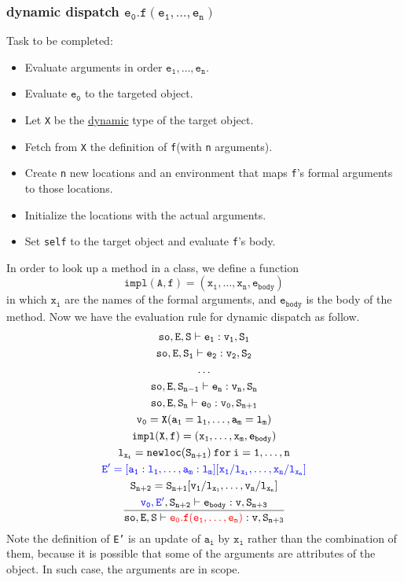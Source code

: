 \subsubsection{dynamic dispatch $\mathtt{e_0.f(e_1,\dots,e_n)}$}
Task to be completed:
\begin{itemize}
\item Evaluate arguments in order $\mathtt{e_1,\dots,e_n}$.
\item Evaluate $\mathtt{e_0}$ to the targeted object.
\item Let \texttt{X} be the \underline{dynamic} type of the target object.
\item Fetch from \texttt{X} the definition of \texttt{f}(with \texttt{n} arguments).
\item Create \texttt{n} new locations and an environment that maps \texttt{f}'s formal arguments to those locations.
\item Initialize the locations with the actual arguments.
\item Set \texttt{self} to the target object and evaluate \texttt{f}'s body.
\end{itemize}
In order to look up a method in a class, we define a function
\begin{equation*}
\mathtt{impl(A,f)=(x_1,\dots,x_n,e_{body})}
\end{equation*}
in which $\mathtt{x_i}$ are the names of the formal arguments, and $\mathtt{e_{body}}$ is the body of the method. Now we have the evaluation rule for dynamic dispatch as follow.
\begin{gather*}
\mathtt{so,E,S\vdash e_1:v_1,S_1}\\
\mathtt{so,E,S_1\vdash e_2:v_2,S_2}\\
\dots\\
\mathtt{so,E,S_{n-1}\vdash e_n:v_n,S_n}\\
\mathtt{so,E,S_n\vdash e_0:v_0,S_{n+1}}\\
\mathtt{v_0=X(a_1=l_1,\dots,a_m=l_m)}\\
\mathtt{impl(X,f)=(x_1,\dots,x_m,e_{body})}\\
\mathtt{l_{x_i} = newloc(S_{n+1})\:for\:i=1,\dots,n}\\
\mathtt{\color{blue}E'=[a_1:l_1,\dots,a_m:l_m][x_1/l_{x_1},\dots,x_n/l_{x_n}]}\\
\mathtt{S_{n+2}=S_{n+1}[v_1/l_{x_1},\dots,v_n/l_{x_n}]}\\
\mathtt{\frac{{\color{blue}v_0,E'},S_{n+2}\vdash e_{body}:v,S_{n+3}}{so,E,S\vdash{\color{red}e_0.f(e_1,\dots,e_n)}:v,S_{n+3}}}
\end{gather*}
Note the definition of \texttt{E'} is an update of $\mathtt{a_i}$ by $\mathtt{x_i}$ rather than the combination of them, because it is possible that some of the arguments are attributes of the object. In such case, the arguments are in scope.
\ifx\PREAMBLE\undefined

\fi